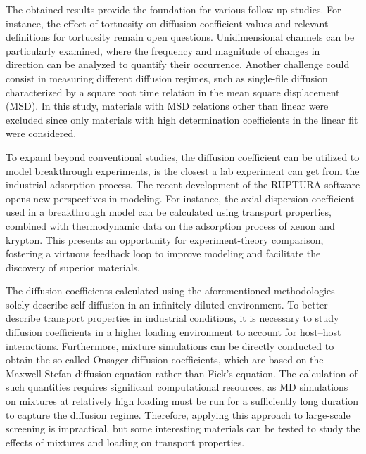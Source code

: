 \documentclass[main]{subfiles}
\begin{document}
The obtained results provide the foundation for various follow-up studies. For instance, the effect of tortuosity on diffusion coefficient values and relevant definitions for tortuosity remain open questions. Unidimensional channels can be particularly examined, where the frequency and magnitude of changes in direction can be analyzed to quantify their occurrence\autocite{Bullitt_2003}. Another challenge could consist in measuring different diffusion regimes, such as single-file diffusion characterized by a square root time relation in the mean square displacement (MSD)\autocite{Lin_2005}. In this study, materials with MSD relations other than linear were excluded since only materials with high determination coefficients in the linear fit were considered.

To expand beyond conventional studies, the diffusion coefficient can be utilized to model breakthrough experiments, is the closest a lab experiment can get from the industrial adsorption process. The recent development of the RUPTURA software\autocite{Sharma_2023} opens new perspectives in modeling. For instance, the axial dispersion coefficient used in a breakthrough model can be calculated using transport properties, combined with thermodynamic data on the adsorption process of xenon and krypton. This presents an opportunity for experiment-theory comparison, fostering a virtuous feedback loop to improve modeling and facilitate the discovery of superior materials.

The diffusion coefficients calculated using the aforementioned methodologies solely describe self-diffusion in an infinitely diluted environment. To better describe transport properties in industrial conditions, it is necessary to study diffusion coefficients in a higher loading environment to account for host--host interactions. Furthermore, mixture simulations can be directly conducted to obtain the so-called Onsager diffusion coefficients, which are based on the Maxwell-Stefan diffusion equation rather than Fick's equation.\autocite{Krishna_2008} The calculation of such quantities requires significant computational resources, as MD simulations on mixtures at relatively high loading must be run for a sufficiently long duration to capture the diffusion regime. Therefore, applying this approach to large-scale screening is impractical, but some interesting materials can be tested to study the effects of mixtures and loading on transport properties.
\end{document}
